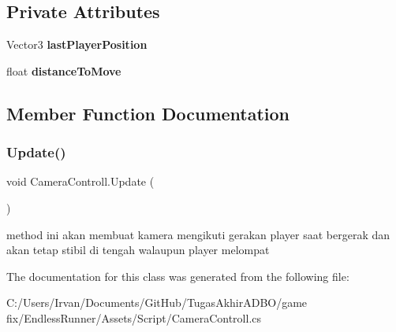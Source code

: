 \subsection*{Private Attributes}
\begin{DoxyCompactItemize}
\item 
\hypertarget{class_camera_controll_a811a96b63a2b0fde284a7b6bad4c1c17}{}\label{class_camera_controll_a811a96b63a2b0fde284a7b6bad4c1c17} 
Vector3 {\bfseries last\+Player\+Position}
\item 
\hypertarget{class_camera_controll_a8ede8e227ec5e447b031d1321e2a991c}{}\label{class_camera_controll_a8ede8e227ec5e447b031d1321e2a991c} 
float {\bfseries distance\+To\+Move}
\end{DoxyCompactItemize}


\subsection{Member Function Documentation}
\hypertarget{class_camera_controll_a79756d5ea4d853ab67752d483395b192}{}\label{class_camera_controll_a79756d5ea4d853ab67752d483395b192} 
\subsubsection{\texorpdfstring{Update()}{Update()}}
{\footnotesize\ttfamily void Camera\+Controll.\+Update (\begin{DoxyParamCaption}{ }\end{DoxyParamCaption})\hspace{0.3cm}{\ttfamily [private]}}



method ini akan membuat kamera mengikuti gerakan player saat bergerak dan akan tetap stibil di tengah walaupun player melompat 



The documentation for this class was generated from the following file\+:\begin{DoxyCompactItemize}
\item 
C\+:/\+Users/\+Irvan/\+Documents/\+Git\+Hub/\+Tugas\+Akhir\+A\+D\+B\+O/game fix/\+Endless\+Runner/\+Assets/\+Script/Camera\+Controll.\+cs\end{DoxyCompactItemize}

